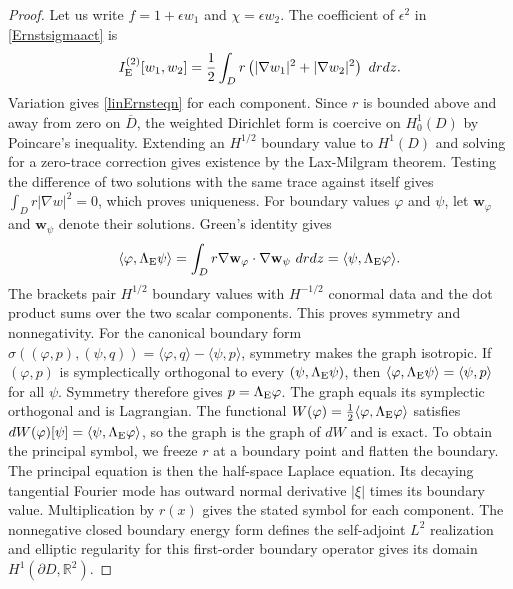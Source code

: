 \documentclass[amsmath,amsfonts,amssymb,aps,pra,superscriptaddress,10pt]{revtex4-2}
\numberwithin{equation}{section}
\theoremstyle{plain}
\theoremstyle{definition}
\theoremstyle{remark}
\theoremstyle{definition}
\begin{document}
\begin{proof}
Let us write $f=1+\epsilon w_1$ and $\chi=\epsilon w_2$. The coefficient of $\epsilon^2$ in \eqref{Ernstsigmaact} is
\begin{equation}
I_{\rm{E}}^{(2)}[w_1,w_2]=\frac{1}{2}\int_D r\left(|\nabla w_1|^2+|\nabla w_2|^2\right)~drdz.
\end{equation}
Variation gives \eqref{linErnsteqn} for each component. Since $r$ is bounded above and away from zero on $\overline{D}$, the weighted Dirichlet form is coercive on $H^1_0(D)$ by Poincare's inequality. Extending an $H^{1/2}$ boundary value to $H^1(D)$ and solving for a zero-trace correction gives existence by the Lax-Milgram theorem. Testing the difference of two solutions with the same trace against itself gives $\int_D r|\nabla w|^2=0$, which proves uniqueness. For boundary values $\varphi$ and $\psi$, let $\mathbf{w}_\varphi$ and $\mathbf{w}_\psi$ denote their solutions. Green's identity gives
\begin{equation}
\langle\varphi,\Lambda_{\rm{E}}\psi\rangle=\int_D r\nabla\mathbf{w}_\varphi\cdot\nabla\mathbf{w}_\psi~drdz
=\langle\psi,\Lambda_{\rm{E}}\varphi\rangle.
\end{equation}
The brackets pair $H^{1/2}$ boundary values with $H^{-1/2}$ conormal data and the dot product sums over the two scalar components. This proves symmetry and nonnegativity. For the canonical boundary form $\sigma\left((\varphi,p),(\psi,q)\right)=\langle\varphi,q\rangle-\langle\psi,p\rangle$, symmetry makes the graph isotropic. If $(\varphi,p)$ is symplectically orthogonal to every $(\psi,\Lambda_{\rm{E}}\psi)$, then $\langle\varphi,\Lambda_{\rm{E}}\psi\rangle=\langle\psi,p\rangle$ for all $\psi$. Symmetry therefore gives $p=\Lambda_{\rm{E}}\varphi$. The graph equals its symplectic orthogonal and is Lagrangian. The functional $W(\varphi)=\frac{1}{2}\langle\varphi,\Lambda_{\rm{E}}\varphi\rangle$ satisfies $dW(\varphi)[\psi]=\langle\psi,\Lambda_{\rm{E}}\varphi\rangle$, so the graph is the graph of $dW$ and is exact. To obtain the principal symbol, we freeze $r$ at a boundary point and flatten the boundary. The principal equation is then the half-space Laplace equation. Its decaying tangential Fourier mode has outward normal derivative $|\xi|$ times its boundary value. Multiplication by $r(x)$ gives the stated symbol for each component. The nonnegative closed boundary energy form defines the self-adjoint $L^2$ realization and elliptic regularity for this first-order boundary operator gives its domain $H^1(\partial D,\mathbb{R}^2)$.
\end{proof}
\end{document}
